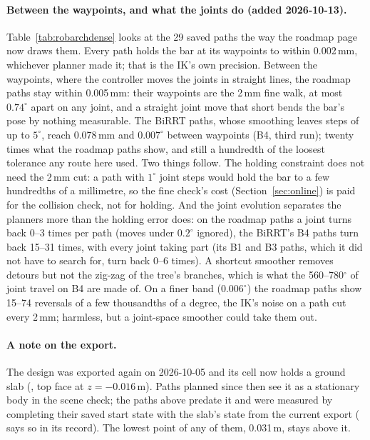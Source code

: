 \paragraph{Between the waypoints, and what the joints do (added 2026-10-13).}
Table~\ref{tab:robarchdense} looks at the 29 saved paths the way the roadmap page
now draws them. Every path holds the bar at its waypoints to within
0.002\,mm, whichever planner made it; that is the IK's own precision. Between the
waypoints, where the controller moves the joints in straight lines, the roadmap
paths stay within 0.005\,mm: their waypoints are the 2\,mm fine walk, at most
$0.74^\circ$ apart on any joint, and a straight joint move that short bends the
bar's pose by nothing measurable. The BiRRT paths, whose smoothing leaves steps of
up to $5^\circ$, reach 0.078\,mm and $0.007^\circ$ between waypoints (B4, third
run); twenty times what the roadmap paths show, and still a hundredth of the
loosest tolerance any route here used. Two things follow. The
holding constraint does not need the 2\,mm cut: a path with $1^\circ$ joint steps
would hold the bar to a few hundredths of a millimetre, so the fine check's cost
(Section~\ref{sec:online}) is paid for the collision check, not for holding.
And the joint evolution separates the planners more than the holding error does:
on the roadmap paths a joint turns back 0--3 times per path (moves under
$0.2^\circ$ ignored), the BiRRT's B4 paths turn back 15--31 times, with every
joint taking part (its B1 and B3 paths, which it did not have to search for,
turn back 0--6 times). A shortcut smoother removes detours but not the
zig-zag of the tree's branches, which is what the 560--780$^\circ$ of joint
travel on B4 are made of. On a finer band ($0.006^\circ$) the roadmap paths show
15--74 reversals of a few thousandths of a degree, the IK's noise on a path cut
every 2\,mm; harmless, but a joint-space smoother could take them out.

\paragraph{A note on the export.} The design was exported again on 2026-10-05 and
its cell now holds a ground slab (, top face at $z=-0.016$\,m).
Paths planned since then see it as a stationary body in the scene check; the
paths above predate it and were measured by completing their saved start state
with the slab's state from the current export ( says so
in its record). The lowest point of any of them, 0.031\,m, stays above it.

